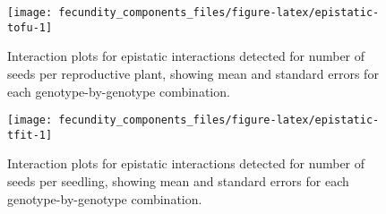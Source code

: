 \documentclass[]{article}
\begin{document}
\newpage

\begin{figure}

{\centering \texttt{[image: fecundity\_components\_files/figure-latex/epistatic-tofu-1]} 

}

\caption[Epistatic interactions for seeds/RP]{Interaction plots for epistatic interactions detected for number of seeds per reproductive plant, showing mean and standard errors for each genotype-by-genotype combination.}\label{fig:epistatic-tofu}
\end{figure}

\newpage

\begin{figure}

{\centering \texttt{[image: fecundity\_components\_files/figure-latex/epistatic-tfit-1]} 

}

\caption[Epistatic interactions for number of seeds/seedling]{Interaction plots for epistatic interactions detected for number of seeds per seedling, showing mean and standard errors for each genotype-by-genotype combination.}\label{fig:epistatic-tfit}
\end{figure}
\end{document}

